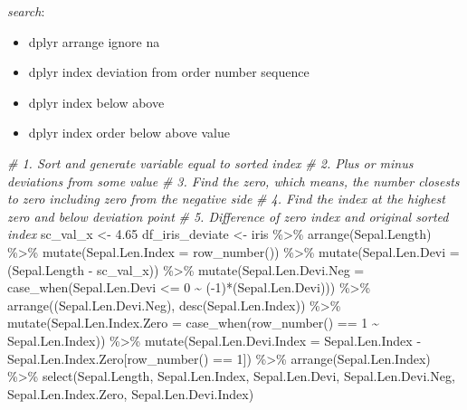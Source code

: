 \documentclass[
]{book}
\newenvironment{Shaded}{\begin{snugshade}}{\end{snugshade}}
\newcommand{\AttributeTok}[1]{\textcolor[rgb]{0.77,0.63,0.00}{#1}}
\newcommand{\CommentTok}[1]{\textcolor[rgb]{0.56,0.35,0.01}{\textit{#1}}}
\newcommand{\DecValTok}[1]{\textcolor[rgb]{0.00,0.00,0.81}{#1}}
\newcommand{\FloatTok}[1]{\textcolor[rgb]{0.00,0.00,0.81}{#1}}
\newcommand{\FunctionTok}[1]{\textcolor[rgb]{0.00,0.00,0.00}{#1}}
\newcommand{\NormalTok}[1]{#1}
\newcommand{\OtherTok}[1]{\textcolor[rgb]{0.56,0.35,0.01}{#1}}
\newcommand{\SpecialCharTok}[1]{\textcolor[rgb]{0.00,0.00,0.00}{#1}}
\providecommand{\tightlist}{%
  \setlength{\itemsep}{0pt}\setlength{\parskip}{0pt}}
\begin{document}
\emph{search}:

\begin{itemize}
\tightlist
\item
  dplyr arrange ignore na
\item
  dplyr index deviation from order number sequence
\item
  dplyr index below above
\item
  dplyr index order below above value
\end{itemize}

\begin{Shaded}
\begin{Highlighting}[]
\CommentTok{\# 1. Sort and generate variable equal to sorted index}
\CommentTok{\# 2. Plus or minus deviations from some value}
\CommentTok{\# 3. Find the zero, which means, the number closests to zero including zero from the negative side}
\CommentTok{\# 4. Find the index at the highest zero and below deviation point}
\CommentTok{\# 5. Difference of zero index and original sorted index}
\NormalTok{sc\_val\_x }\OtherTok{\textless{}{-}} \FloatTok{4.65}
\NormalTok{df\_iris\_deviate }\OtherTok{\textless{}{-}}\NormalTok{ iris }\SpecialCharTok{\%\textgreater{}\%} \FunctionTok{arrange}\NormalTok{(Sepal.Length) }\SpecialCharTok{\%\textgreater{}\%}
              \FunctionTok{mutate}\NormalTok{(}\AttributeTok{Sepal.Len.Index =} \FunctionTok{row\_number}\NormalTok{()) }\SpecialCharTok{\%\textgreater{}\%}
              \FunctionTok{mutate}\NormalTok{(}\AttributeTok{Sepal.Len.Devi =}\NormalTok{ (Sepal.Length }\SpecialCharTok{{-}}\NormalTok{ sc\_val\_x)) }\SpecialCharTok{\%\textgreater{}\%}
              \FunctionTok{mutate}\NormalTok{(}\AttributeTok{Sepal.Len.Devi.Neg =}
                       \FunctionTok{case\_when}\NormalTok{(Sepal.Len.Devi }\SpecialCharTok{\textless{}=} \DecValTok{0} \SpecialCharTok{\textasciitilde{}}\NormalTok{ (}\SpecialCharTok{{-}}\DecValTok{1}\NormalTok{)}\SpecialCharTok{*}\NormalTok{(Sepal.Len.Devi))) }\SpecialCharTok{\%\textgreater{}\%}
              \FunctionTok{arrange}\NormalTok{((Sepal.Len.Devi.Neg), }\FunctionTok{desc}\NormalTok{(Sepal.Len.Index)) }\SpecialCharTok{\%\textgreater{}\%}
              \FunctionTok{mutate}\NormalTok{(}\AttributeTok{Sepal.Len.Index.Zero =}
                       \FunctionTok{case\_when}\NormalTok{(}\FunctionTok{row\_number}\NormalTok{() }\SpecialCharTok{==} \DecValTok{1} \SpecialCharTok{\textasciitilde{}}\NormalTok{ Sepal.Len.Index)) }\SpecialCharTok{\%\textgreater{}\%}
              \FunctionTok{mutate}\NormalTok{(}\AttributeTok{Sepal.Len.Devi.Index =}
\NormalTok{                       Sepal.Len.Index }\SpecialCharTok{{-}}\NormalTok{ Sepal.Len.Index.Zero[}\FunctionTok{row\_number}\NormalTok{() }\SpecialCharTok{==} \DecValTok{1}\NormalTok{]) }\SpecialCharTok{\%\textgreater{}\%}
              \FunctionTok{arrange}\NormalTok{(Sepal.Len.Index) }\SpecialCharTok{\%\textgreater{}\%}
              \FunctionTok{select}\NormalTok{(Sepal.Length, Sepal.Len.Index, Sepal.Len.Devi,}
\NormalTok{                     Sepal.Len.Devi.Neg, Sepal.Len.Index.Zero, Sepal.Len.Devi.Index)}



\end{Highlighting}
\end{Shaded}
\end{document}
